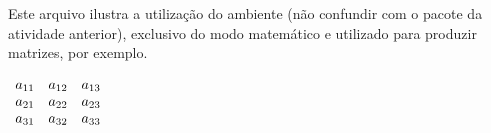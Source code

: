 \documentclass[a4paper,12pt]{article}
\begin{document}
	Este arquivo ilustra a utilização do ambiente  (não confundir com o pacote  da atividade anterior), exclusivo do modo matemático e utilizado para produzir matrizes, por exemplo.

	\linhabase\hfill
	\(
		\begin{array}[c]{ccc}
		a_{11} & a_{12} & a_{13} \\
		a_{21} & a_{22} & a_{23} \\
		a_{31} & a_{32} & a_{33}
		\end{array}
	\)%
	\hfill\null
	
	
\end{document}
